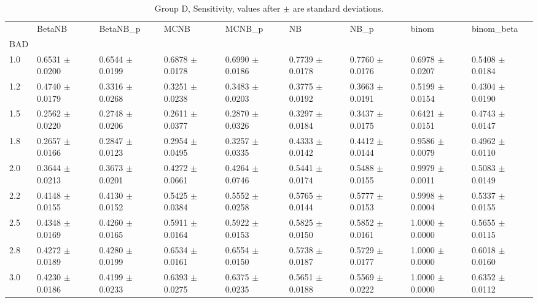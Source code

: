 \begin{table}[H]
\centering
\begin{adjustbox}{max width=\linewidth}
\begin{tabular}{lllllllll}
\toprule
 & BetaNB & BetaNB\_p & MCNB & MCNB\_p & NB & NB\_p & binom & binom\_beta \\
BAD &  &  &  &  &  &  &  &  \\
\midrule
1.0 & 0.6531 $\pm$ 0.0200 & 0.6544 $\pm$ 0.0199 & 0.6878 $\pm$ 0.0178 & 0.6990 $\pm$ 0.0186 & 0.7739 $\pm$ 0.0178 & 0.7760 $\pm$ 0.0176 & 0.6978 $\pm$ 0.0207 & 0.5408 $\pm$ 0.0184 \\
1.2 & 0.4740 $\pm$ 0.0179 & 0.3316 $\pm$ 0.0268 & 0.3251 $\pm$ 0.0238 & 0.3483 $\pm$ 0.0203 & 0.3775 $\pm$ 0.0192 & 0.3663 $\pm$ 0.0191 & 0.5199 $\pm$ 0.0154 & 0.4304 $\pm$ 0.0190 \\
1.5 & 0.2562 $\pm$ 0.0220 & 0.2748 $\pm$ 0.0206 & 0.2611 $\pm$ 0.0377 & 0.2870 $\pm$ 0.0326 & 0.3297 $\pm$ 0.0184 & 0.3437 $\pm$ 0.0175 & 0.6421 $\pm$ 0.0151 & 0.4743 $\pm$ 0.0147 \\
1.8 & 0.2657 $\pm$ 0.0166 & 0.2847 $\pm$ 0.0123 & 0.2954 $\pm$ 0.0495 & 0.3257 $\pm$ 0.0335 & 0.4333 $\pm$ 0.0142 & 0.4412 $\pm$ 0.0144 & 0.9586 $\pm$ 0.0079 & 0.4962 $\pm$ 0.0110 \\
2.0 & 0.3644 $\pm$ 0.0213 & 0.3673 $\pm$ 0.0201 & 0.4272 $\pm$ 0.0661 & 0.4264 $\pm$ 0.0746 & 0.5441 $\pm$ 0.0174 & 0.5488 $\pm$ 0.0155 & 0.9979 $\pm$ 0.0011 & 0.5083 $\pm$ 0.0149 \\
2.2 & 0.4148 $\pm$ 0.0155 & 0.4130 $\pm$ 0.0152 & 0.5425 $\pm$ 0.0384 & 0.5552 $\pm$ 0.0258 & 0.5765 $\pm$ 0.0144 & 0.5777 $\pm$ 0.0153 & 0.9998 $\pm$ 0.0004 & 0.5337 $\pm$ 0.0155 \\
2.5 & 0.4348 $\pm$ 0.0169 & 0.4260 $\pm$ 0.0165 & 0.5911 $\pm$ 0.0164 & 0.5922 $\pm$ 0.0153 & 0.5825 $\pm$ 0.0150 & 0.5852 $\pm$ 0.0161 & 1.0000 $\pm$ 0.0000 & 0.5655 $\pm$ 0.0115 \\
2.8 & 0.4272 $\pm$ 0.0189 & 0.4280 $\pm$ 0.0199 & 0.6534 $\pm$ 0.0161 & 0.6554 $\pm$ 0.0150 & 0.5738 $\pm$ 0.0187 & 0.5729 $\pm$ 0.0177 & 1.0000 $\pm$ 0.0000 & 0.6018 $\pm$ 0.0160 \\
3.0 & 0.4230 $\pm$ 0.0186 & 0.4199 $\pm$ 0.0233 & 0.6393 $\pm$ 0.0275 & 0.6375 $\pm$ 0.0235 & 0.5651 $\pm$ 0.0188 & 0.5569 $\pm$ 0.0222 & 1.0000 $\pm$ 0.0000 & 0.6352 $\pm$ 0.0112 \\
\bottomrule
\end{tabular}

\end{adjustbox}
\caption{Group D, Sensitivity, values after $\pm$ are standard deviations.}
\end{table}

